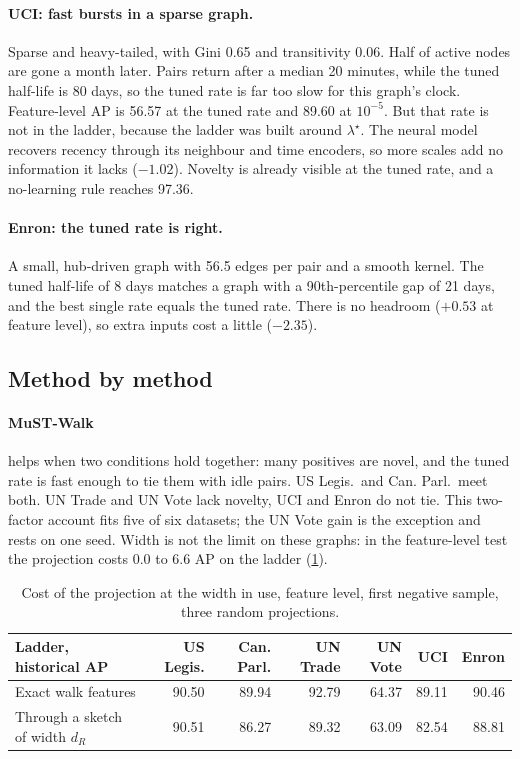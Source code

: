 \documentclass[11pt,a4paper]{article}
\theoremstyle{plain}
\theoremstyle{definition}
\begin{document}
\paragraph{UCI: fast bursts in a sparse graph.} Sparse and heavy-tailed, with Gini 0.65 and transitivity 0.06. Half of active nodes are gone a month later. Pairs return after a median 20 minutes, while the tuned half-life is 80 days, so the tuned rate is far too slow for this graph's clock. Feature-level AP is 56.57 at the tuned rate and 89.60 at $10^{-5}$. But that rate is not in the ladder, because the ladder was built around $\lambda^\star$. The neural model recovers recency through its neighbour and time encoders, so more scales add no information it lacks ($-1.02$). Novelty is already visible at the tuned rate, and a no-learning rule reaches 97.36.

\paragraph{Enron: the tuned rate is right.} A small, hub-driven graph with 56.5 edges per pair and a smooth kernel. The tuned half-life of 8 days matches a graph with a 90th-percentile gap of 21 days, and the best single rate equals the tuned rate. There is no headroom ($+0.53$ at feature level), so extra inputs cost a little ($-2.35$).

\subsection{Method by method}
\paragraph{MuST-Walk} helps when two conditions hold together: many positives are novel, and the tuned rate is fast enough to tie them with idle pairs. US Legis.\ and Can. Parl.\ meet both. UN Trade and UN Vote lack novelty, UCI and Enron do not tie. This two-factor account fits five of six datasets; the UN Vote gain is the exception and rests on one seed. Width is not the limit on these graphs: in the feature-level test the projection costs 0.0 to 6.6 AP on the ladder (\cref{tab:sketch}).

\begin{table}[H]\centering\small
\begin{tabular}{lrrrrrr}
\toprule
Ladder, historical AP & US Legis. & Can. Parl. & UN Trade & UN Vote & UCI & Enron\\
\midrule
Exact walk features & 90.50 & 89.94 & 92.79 & 64.37 & 89.11 & 90.46\\
Through a sketch of width $d_R$ & 90.51 & 86.27 & 89.32 & 63.09 & 82.54 & 88.81\\
\bottomrule
\end{tabular}
\caption{Cost of the projection at the width in use, feature level, first negative sample, three random projections.}\label{tab:sketch}
\end{table}
\end{document}
